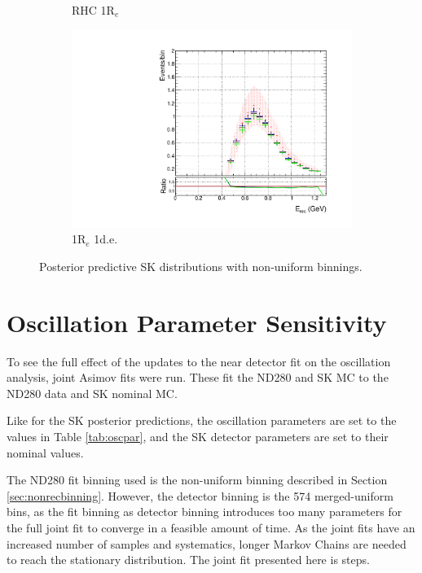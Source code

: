 \begin{figure}
\begin{subfigure}{.49\textwidth}
   \caption{RHC 1R$_{e}$}
  \label{fig:skppnuebar}
  \end{subfigure}
\begin{subfigure}{.49\textwidth}
  \centering
  \includegraphics[width=0.95\linewidth]{figs/polySKnue1pi}
   \caption{1R$_{e}$ 1d.e.}
  \label{fig:skppnue1pi}
\end{subfigure}
\caption{Posterior predictive SK distributions with non-uniform binnings.}
\label{fig:skpppoly}
\end{figure}

\section{Oscillation Parameter Sensitivity}\label{sec:oscpar}

To see the full effect of the updates to the near detector fit on the oscillation analysis, joint Asimov fits were run. These fit the ND280 and SK MC to the ND280 data and SK nominal MC. 

Like for the SK posterior predictions, the oscillation parameters are set to the values in Table \ref{tab:oscpar}, and the SK detector parameters are set to their nominal values. 

The ND280 fit binning used is the non-uniform binning described in Section \ref{sec:nonrecbinning}. However, the detector binning is the 574 merged-uniform bins, as the fit binning as detector binning introduces too many parameters for the full joint fit to converge in a feasible amount of time. As the joint fits have an increased number of samples and systematics, longer Markov Chains are needed to reach the stationary distribution. The joint fit presented here is  steps. 


